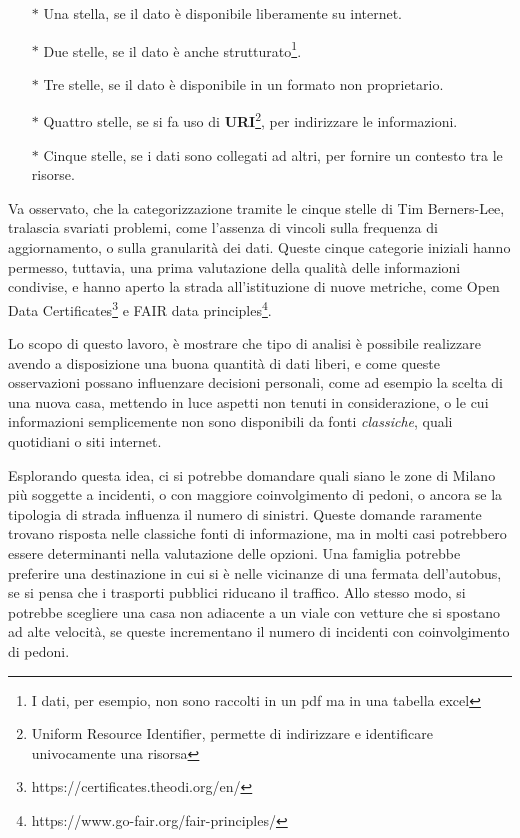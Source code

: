 \documentclass[a4paper,12pt]{report}
\newcommand{\quotestyle}[1]{\textit{#1}}
\newcommand{\engstyle}[1]{\textbf{#1}}
\newcommand{\skipline}{\vspace{0.2in}}
\begin{document}
\begin{itemize}
    \item[$\ast$] Una stella, se il dato è disponibile liberamente su internet. 
    \item[$\ast$] Due stelle, se il dato è anche strutturato\footnote{I dati, 
    per esempio, non sono raccolti in un pdf ma in una tabella excel}. 
    \item[$\ast$] Tre stelle, se il dato è disponibile in un formato non proprietario. 
    \item[$\ast$] Quattro stelle, se si fa uso 
    di \engstyle{URI}\footnote{Uniform Resource Identifier, permette di indirizzare e 
    identificare univocamente una risorsa}, per indirizzare le informazioni. 
    \item[$\ast$] Cinque stelle, se i dati sono collegati ad altri, 
    per fornire un contesto tra le risorse. 
\end{itemize}

Va osservato, che la categorizzazione tramite le cinque stelle di Tim Berners-Lee, 
tralascia svariati problemi, come l'assenza di vincoli sulla 
frequenza di aggiornamento, o sulla granularità dei dati. 
Queste cinque categorie iniziali hanno permesso, tuttavia, una prima valutazione 
della qualità delle informazioni condivise, 
e hanno aperto la strada all'istituzione di nuove metriche, come 
Open Data Certificates\footnote{https://certificates.theodi.org/en/} e FAIR data 
principles\footnote{https://www.go-fair.org/fair-principles/}. 

\skipline
Lo scopo di questo lavoro, è mostrare che tipo di analisi è possibile realizzare 
avendo a disposizione una buona quantità di dati liberi, e come queste osservazioni possano 
influenzare decisioni personali, come ad esempio la scelta di una nuova casa, 
mettendo in luce aspetti non tenuti in considerazione, o le cui informazioni semplicemente 
non sono disponibili da fonti \quotestyle{classiche}, quali quotidiani o siti internet. 

Esplorando questa idea, ci si potrebbe domandare quali siano le zone 
di Milano più soggette a incidenti, o con maggiore coinvolgimento di pedoni, 
o ancora se la tipologia di strada influenza il numero di sinistri. 
Queste domande raramente trovano risposta nelle classiche fonti di informazione, 
ma in molti casi potrebbero essere determinanti nella valutazione delle opzioni. 
Una famiglia potrebbe preferire una destinazione in cui si è nelle 
vicinanze di una fermata dell'autobus, se si pensa che i trasporti pubblici riducano 
il traffico. 
Allo stesso modo, si potrebbe scegliere una casa non adiacente 
a un viale con vetture che si spostano ad alte velocità, se queste incrementano 
il numero di incidenti con coinvolgimento di pedoni. 
\end{document}
